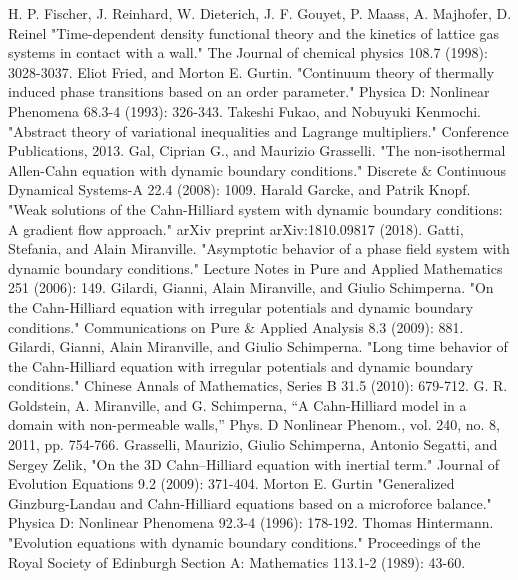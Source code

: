 \documentclass[a4paper]{article}
\begin{document}
\begin{thebibliography}{99}
		H. P. Fischer, J. Reinhard, W. Dieterich, J. F. Gouyet, P. Maass, A. Majhofer, D. Reinel "Time-dependent density functional theory and the kinetics of lattice gas systems in contact with a wall." The Journal of chemical physics 108.7 (1998): 3028-3037.
		Eliot Fried, and Morton E. Gurtin. "Continuum theory of thermally induced phase transitions based on an order parameter." Physica D: Nonlinear Phenomena 68.3-4 (1993): 326-343.
		Takeshi Fukao, and Nobuyuki Kenmochi. "Abstract theory of variational inequalities and Lagrange multipliers." Conference Publications, 2013.
		Gal, Ciprian G., and Maurizio Grasselli. "The non-isothermal Allen-Cahn equation with dynamic boundary conditions." Discrete \& Continuous Dynamical Systems-A 22.4 (2008): 1009.
		Harald Garcke, and Patrik Knopf. "Weak solutions of the Cahn-Hilliard system with dynamic boundary conditions: A gradient flow approach." arXiv preprint arXiv:1810.09817 (2018).
		Gatti, Stefania, and Alain Miranville. "Asymptotic behavior of a phase field system with dynamic boundary conditions." Lecture Notes in Pure and Applied Mathematics 251 (2006): 149.
		Gilardi, Gianni, Alain Miranville, and Giulio Schimperna. "On the Cahn-Hilliard equation with irregular potentials and dynamic boundary conditions." Communications on Pure \& Applied Analysis 8.3 (2009): 881.
		Gilardi, Gianni, Alain Miranville, and Giulio Schimperna. "Long time behavior of the Cahn-Hilliard equation with irregular potentials and dynamic boundary conditions." Chinese Annals of Mathematics, Series B 31.5 (2010): 679-712.
		G. R. Goldstein, A. Miranville, and G. Schimperna, “A Cahn-Hilliard model in a domain with non-permeable walls,” Phys. D Nonlinear Phenom., vol. 240, no. 8, 2011, pp. 754-766.
		Grasselli, Maurizio, Giulio Schimperna, Antonio Segatti, and Sergey Zelik, "On the 3D Cahn–Hilliard equation with inertial term." Journal of Evolution Equations 9.2 (2009): 371-404.
		Morton E. Gurtin "Generalized Ginzburg-Landau and Cahn-Hilliard equations based on a microforce balance." Physica D: Nonlinear Phenomena 92.3-4 (1996): 178-192.
		Thomas Hintermann. "Evolution equations with dynamic boundary conditions." Proceedings of the Royal Society of Edinburgh Section A: Mathematics 113.1-2 (1989): 43-60.

\end{thebibliography}
\end{document}
